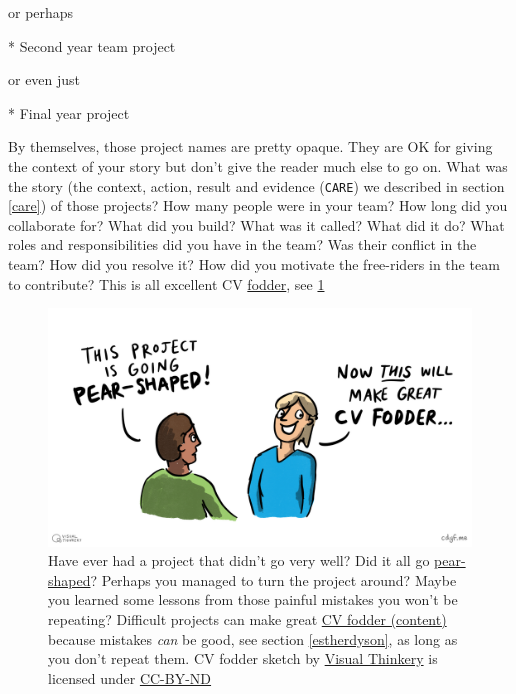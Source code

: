 \documentclass[
]{book}
\newenvironment{Shaded}{\begin{snugshade}}{\end{snugshade}}
\newcommand{\NormalTok}[1]{#1}
\newcommand{\SpecialStringTok}[1]{\textcolor[rgb]{0.31,0.60,0.02}{#1}}
\begin{document}
or perhaps

\begin{Shaded}
\begin{Highlighting}[]
\SpecialStringTok{* }\NormalTok{Second year team project}
\end{Highlighting}
\end{Shaded}

or even just

\begin{Shaded}
\begin{Highlighting}[]
\SpecialStringTok{* }\NormalTok{Final year project}
\end{Highlighting}
\end{Shaded}

By themselves, those project names are pretty opaque. They are OK for giving the context of your story but don't give the reader much else to go on. What was the story (the context, action, result and evidence (\texttt{CARE}) we described in section \ref{care}) of those projects? How many people were in your team? How long did you collaborate for? What did you build? What was it called? What did it do? What roles and responsibilities did you have in the team? Was their conflict in the team? How did you resolve it? How did you motivate the free-riders in the team to contribute? This is all excellent CV \href{https://en.wikipedia.org/wiki/Fodder}{fodder}, see \ref{fig:cvfodder-fig}

\begin{figure}

{\centering \includegraphics[width=0.98\linewidth]{images/CV Fodder} 

}

\caption{Have ever had a project that didn't go very well? Did it all go \href{https://en.wikipedia.org/wiki/Pear-shaped}{pear-shaped}? Perhaps you managed to turn the project around? Maybe you learned some lessons from those painful mistakes you won't be repeating? Difficult projects can make great \href{https://en.wikipedia.org/wiki/Fodder}{CV fodder (content)} because mistakes \emph{can} be good, see section \ref{estherdyson}, as long as you don't repeat them. CV fodder sketch by \href{https://visualthinkery.com/}{Visual Thinkery} is licensed under \href{https://creativecommons.org/licenses/by-nd/4.0/}{CC-BY-ND}}\label{fig:cvfodder-fig}
\end{figure}
\end{document}
